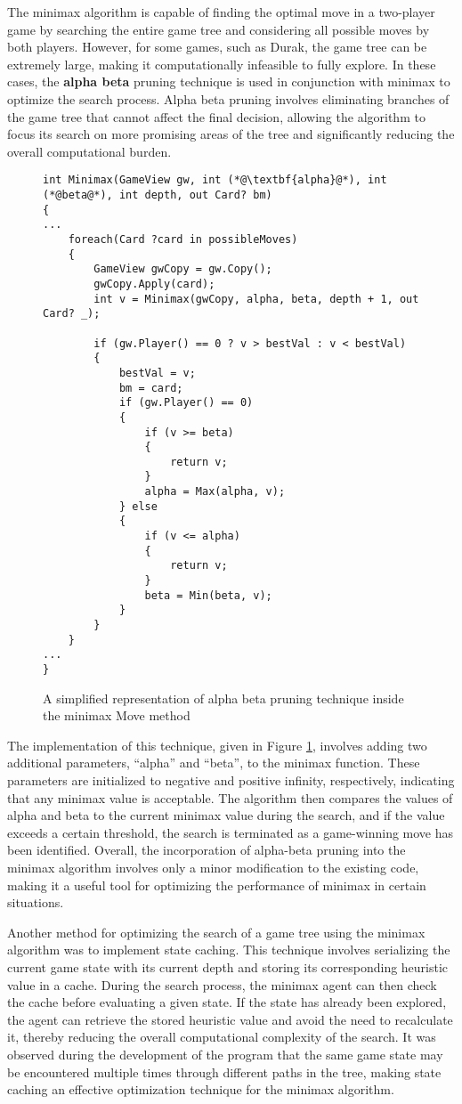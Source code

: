 The minimax algorithm is capable of finding the optimal move in a two-player game by searching the entire game tree and considering all possible moves by both players. However, for some games, such as Durak, the game tree can be extremely large, making it computationally infeasible to fully explore. In these cases, the \textbf{alpha beta} pruning technique is used in conjunction with minimax to optimize the search process. Alpha beta pruning involves eliminating branches of the game tree that cannot affect the final decision, allowing the algorithm to focus its search on more promising areas of the tree and significantly reducing the overall computational burden.

\begin{figure}[h]
\captionsetup{justification=centering}
\begin{lstlisting}
int Minimax(GameView gw, int (*@\textbf{alpha}@*), int (*@beta@*), int depth, out Card? bm)
{
...
	foreach(Card ?card in possibleMoves)
	{
		GameView gwCopy = gw.Copy();
		gwCopy.Apply(card);
		int v = Minimax(gwCopy, alpha, beta, depth + 1, out Card? _);

		if (gw.Player() == 0 ? v > bestVal : v < bestVal)
		{
			bestVal = v;
			bm = card;
			if (gw.Player() == 0)
			{
				if (v >= beta)
				{
					return v;
				}
				alpha = Max(alpha, v);
			} else
			{
				if (v <= alpha)
				{
					return v;
				}
				beta = Min(beta, v);
			}
		}
	}
...
}
\end{lstlisting}
\caption{A simplified representation of alpha beta pruning technique inside the minimax Move method}
\label{fig:alphabeta}
\end{figure}

The implementation of this technique, given in Figure \ref{fig:alphabeta}, involves adding two additional parameters, ``alpha'' and ``beta'', to the minimax function. These parameters are initialized to negative and positive infinity, respectively, indicating that any minimax value is acceptable. The algorithm then compares the values of alpha and beta to the current minimax value during the search, and if the value exceeds a certain threshold, the search is terminated as a game-winning move has been identified. Overall, the incorporation of alpha-beta pruning into the minimax algorithm involves only a minor modification to the existing code, making it a useful tool for optimizing the performance of minimax in certain situations.

Another method for optimizing the search of a game tree using the minimax algorithm was to implement state caching. This technique involves serializing the current game state with its current depth and storing its corresponding heuristic value in a cache. During the search process, the minimax agent can then check the cache before evaluating a given state. If the state has already been explored, the agent can retrieve the stored heuristic value and avoid the need to recalculate it, thereby reducing the overall computational complexity of the search. It was observed during the development of the program that the same game state may be encountered multiple times through different paths in the tree, making state caching an effective optimization technique for the minimax algorithm.



